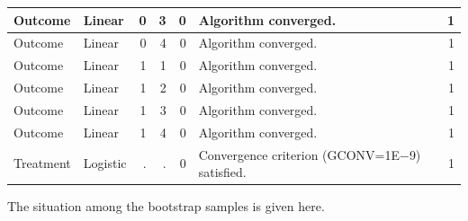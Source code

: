 \documentclass[10pt]{article}
\begin{document}
\begin{minipage}{\textwidth}
{\begin{tabular}{|l|l|r|r|r|l|r|}
   Outcome &    Linear &    0 &    3 &            0 &    Algorithm converged. &            1\\\hline
   Outcome &    Linear &    0 &    4 &            0 &    Algorithm converged. &            1\\\hline
   Outcome &    Linear &    1 &    1 &            0 &    Algorithm converged. &            1\\\hline
   Outcome &    Linear &    1 &    2 &            0 &    Algorithm converged. &            1\\\hline
   Outcome &    Linear &    1 &    3 &            0 &    Algorithm converged. &            1\\\hline
   Outcome &    Linear &    1 &    4 &            0 &    Algorithm converged. &            1\\\hline
   Treatment &    Logistic &    . &    . &            0 &    Convergence criterion (GCONV=1E$-$9) satisfied. &            1\\\hline
\end{tabular}}
\end{minipage}
\newpage
The situation among the bootstrap samples is given here.
\vspace{0.2in}
\end{document}
